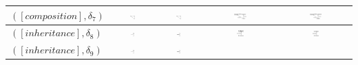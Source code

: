 \documentclass{eceasst}
\begin{document}
\begin{table}[h]
\begin{center}
\begin{tabular}{| l | c | c | c | c | }
    $([composition], \delta_7)$ 		  & \includegraphics[width=0.13\textwidth]{comp-L.pdf} & \includegraphics[width=0.13\textwidth]{comp-R.pdf} & 
				    \includegraphics[width=0.19\textwidth]{comp-L-delta.pdf} & \includegraphics[width=0.19\textwidth]{comp-R-delta.pdf} \\ \hline 			
    $([inheritance], \delta_8)$ 		  & \includegraphics[width=0.08\textwidth]{inheritance-L.pdf} & \includegraphics[width=0.08\textwidth]{inheritance-R.pdf} & 
				    \includegraphics[width=0.10\textwidth]{inheritance-L-delta.pdf} & \includegraphics[width=0.10\textwidth]{inheritance-R-delta.pdf} \\ \hline
    $([inheritance], \delta_9)$ 		  & \includegraphics[width=0.08\textwidth]{inheritance-L.pdf} & \includegraphics[width=0.08\textwidth]{inheritance-R.pdf} & 

\end{tabular}
\end{center}
\end{table}
\end{document}

